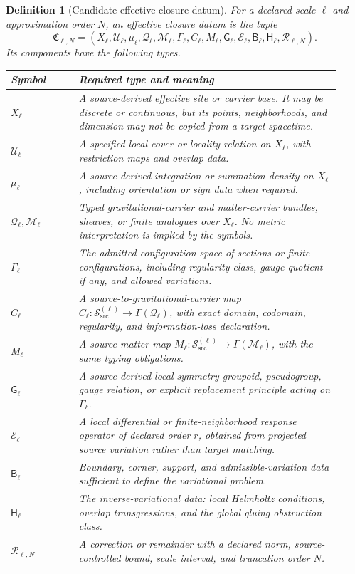 \documentclass[11pt]{article}
\newtheorem{definition}{Definition}
\newcommand{\Qeff}{\mathcal Q_{\ell}}
\newcommand{\Meff}{\mathcal M_{\ell}}
\newcommand{\Conf}{\Gamma_{\ell}}
\newcommand{\Eop}{\mathcal E_{\ell}}
\newcommand{\Rem}{\mathcal R_{\ell,N}}
\begin{document}
\begin{definition}[Candidate effective closure datum]
For a declared scale \(\ell\) and approximation order \(N\), an effective
closure datum is the tuple
\[
 \mathfrak C_{\ell,N}=
 (X_\ell,\mathcal U_\ell,\mu_\ell,\Qeff,\Meff,\Conf,
 C_\ell,M_\ell,\mathsf G_\ell,\Eop,
 \mathsf B_\ell,\mathsf H_\ell,\Rem).
\]
Its components have the following types.
\begin{longtable}{p{0.19\linewidth}p{0.73\linewidth}}
\toprule
Symbol & Required type and meaning\\
\midrule
\(X_\ell\) &
A source-derived effective site or carrier base.  It may be discrete or
continuous, but its points, neighborhoods, and dimension may not be copied
from a target spacetime.\\
\(\mathcal U_\ell\) &
A specified local cover or locality relation on \(X_\ell\), with restriction
maps and overlap data.\\
\(\mu_\ell\) &
A source-derived integration or summation density on \(X_\ell\), including
orientation or sign data when required.\\
\(\Qeff,\Meff\) &
Typed gravitational-carrier and matter-carrier bundles, sheaves, or finite
analogues over \(X_\ell\).  No metric interpretation is implied by the
symbols.\\
\(\Conf\) &
The admitted configuration space of sections or finite configurations,
including regularity class, gauge quotient if any, and allowed variations.\\
\(C_\ell\) &
A source-to-gravitational-carrier map
\(C_\ell:\mathcal S_{\mathrm{src}}^{(\ell)}
\rightarrow\Gamma(\Qeff)\), with exact domain, codomain, regularity, and
information-loss declaration.\\
\(M_\ell\) &
A source-matter map
\(M_\ell:\mathcal S_{\mathrm{src}}^{(\ell)}
\rightarrow\Gamma(\Meff)\), with the same typing obligations.\\
\(\mathsf G_\ell\) &
A source-derived local symmetry groupoid, pseudogroup, gauge relation, or
explicit replacement principle acting on \(\Conf\).\\
\(\Eop\) &
A local differential or finite-neighborhood response operator of declared
order \(r\), obtained from projected source variation rather than target
matching.\\
\(\mathsf B_\ell\) &
Boundary, corner, support, and admissible-variation data sufficient to define
the variational problem.\\
\(\mathsf H_\ell\) &
The inverse-variational data: local Helmholtz conditions, overlap
transgressions, and the global gluing obstruction class.\\
\(\Rem\) &
A correction or remainder with a declared norm, source-controlled bound,
scale interval, and truncation order \(N\).\\
\bottomrule
\end{longtable}
\end{definition}
\end{document}
